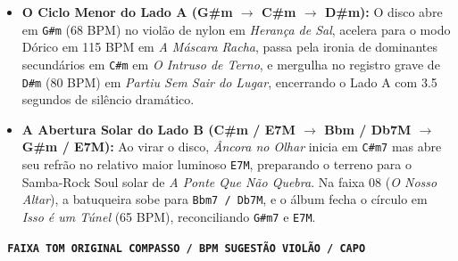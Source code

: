 \documentclass[10pt]{article}
\begin{document}
\begin{itemize}
  \item \textbf{O Ciclo Menor do Lado A (G\#m $\rightarrow$ C\#m $\rightarrow$ D\#m):} O disco abre em \texttt{G\#m} (68 BPM) no violão de nylon em \textit{Herança de Sal}, acelera para o modo Dórico em 115 BPM em \textit{A Máscara Racha}, passa pela ironia de dominantes secundários em \texttt{C\#m} em \textit{O Intruso de Terno}, e mergulha no registro grave de \texttt{D\#m} (80 BPM) em \textit{Partiu Sem Sair do Lugar}, encerrando o Lado A com 3.5 segundos de silêncio dramático.
  \item \textbf{A Abertura Solar do Lado B (C\#m / E7M $\rightarrow$ Bbm / Db7M $\rightarrow$ G\#m / E7M):} Ao virar o disco, \textit{Âncora no Olhar} inicia em \texttt{C\#m7} mas abre seu refrão no relativo maior luminoso \texttt{E7M}, preparando o terreno para o Samba-Rock Soul solar de \textit{A Ponte Que Não Quebra}. Na faixa 08 (\textit{O Nosso Altar}), a batuqueira sobe para \texttt{Bbm7 / Db7M}, e o álbum fecha o círculo em \textit{Isso é um Túnel} (65 BPM), reconciliando \texttt{G\#m7} e \texttt{E7M}.
\end{itemize}

\vspace{0.3cm}
\par
\vspace{0.15cm}
\noindent{\color{vinylochre}\rule{\textwidth}{0.8pt}}\par
\vspace{0.15cm}

\noindent\texttt{\footnotesize\bfseries\color{vinylrust} FAIXA \hfill TOM ORIGINAL \hfill COMPASSO / BPM \hfill SUGESTÃO VIOLÃO / CAPO}\par
\vspace{0.08cm}
\noindent{\color{vinylochre}\rule{\textwidth}{0.4pt}}\par
\end{document}
